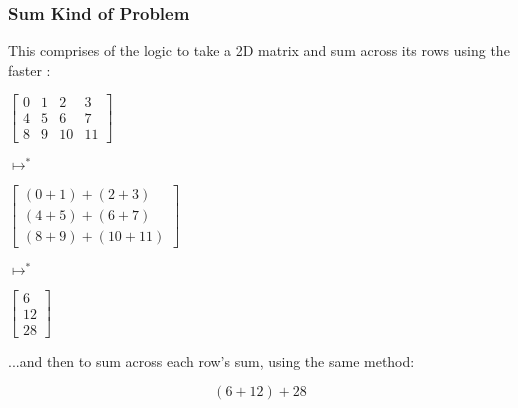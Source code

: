 \documentclass[aspectratio=169, handout]{beamer}
\begin{document}
\begin{frame}[fragile]
  \frametitle{Sum Kind of Problem}

  This comprises of the logic to take a 2D matrix and sum across its rows using
  the faster :

  \begin{center}
  \pause
  \begin{minipage}{0.2\textwidth}
    \centering
    $\begin{bmatrix}
      0 & 1 & 2 & 3\\
      4 & 5 & 6 & 7 \\
      8 & 9 & 10 & 11
    \end{bmatrix}$
  \end{minipage}
  \pause
  \begin{minipage}{0.12\textwidth}
    \centering
    $\longmapsto^*$
  \end{minipage}
  \begin{minipage}{0.3\textwidth}
    \centering
    $\begin{bmatrix}
      (0 + 1) + (2 + 3) \\
      (4 + 5) + (6 + 7) \\
      (8 + 9) + (10 + 11)
    \end{bmatrix}$
  \end{minipage}
  \pause
  \begin{minipage}{0.12\textwidth}
    \centering
    $\longmapsto^*$
  \end{minipage}
  \begin{minipage}{0.12\textwidth}
    \centering
    $\begin{bmatrix}
      6 \\
      12 \\
      28
    \end{bmatrix}$
  \end{minipage}
  \end{center}

  \pause
  \vspace{\fill}

  ...and then to sum across each row's sum, using the same method:

  \vspace{\fill}

  $$(6 + 12) + 28$$
\end{frame}
\end{document}

